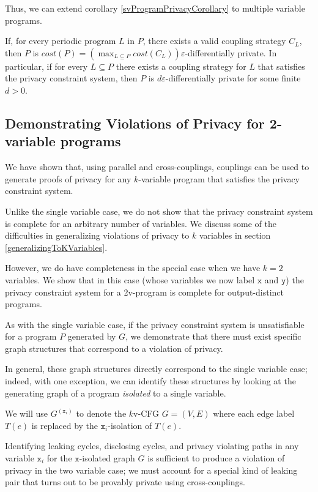 Thus, we can extend corollary \ref{svProgramPrivacyCorollary} to multiple variable programs. 

\begin{lemma}\label{mvCouplingImpliesPrivacyLemma}
    If, for every periodic program $L$ in $P$, there exists a valid coupling strategy $C_L$, then $P$ is $cost(P) = (\max_{L\subseteq P} cost(C_L))\varepsilon$-differentially private. In particular, if for every $L\subseteq P$ there exists a coupling strategy for $L$ that satisfies the privacy constraint system, then $P$ is $d\varepsilon$-differentially private for some finite $d>0$.
\end{lemma}

\subsection{Demonstrating Violations of Privacy for 2-variable programs}

We have shown that, using parallel and cross-couplings, couplings can be used to generate proofs of privacy for any $k$-variable program that satisfies the privacy constraint system. 

Unlike the single variable case, we do not show that the privacy constraint system is complete for an arbitrary number of variables. We discuss some of the difficulties in generalizing violations of privacy to $k$ variables in section \ref{generalizingToKVariables}.

However, we do have completeness in the special case when we have $k=2$ variables. We show that in this case (whose variables we now label $\texttt{x}$ and $\texttt{y}$) the privacy constraint system for a 2v-program is complete for output-distinct programs. 

As with the single variable case, if the privacy constraint system is unsatisfiable for a program $P$ generated by $G$, we demonstrate that there must exist specific graph structures that correspond to a violation of privacy.

In general, these graph structures directly correspond to the single variable case; indeed, with one exception, we can identify these structures by looking at the generating graph of a program \textit{isolated} to a single variable. 

We will use $G^{(\texttt{x}_i)}$ to denote the $k$v-CFG $G = (V, E)$ where each edge label $T(e)$ is replaced by the $\texttt{x}_i$-isolation of $T(e)$. 

Identifying leaking cycles, disclosing cycles, and privacy violating paths in any variable $\texttt{x}_i$ for the $\texttt{x}$-isolated graph $G$ is sufficient to produce a violation of privacy in the two variable case; we must account for a special kind of leaking pair that turns out to be provably private using cross-couplings. 

